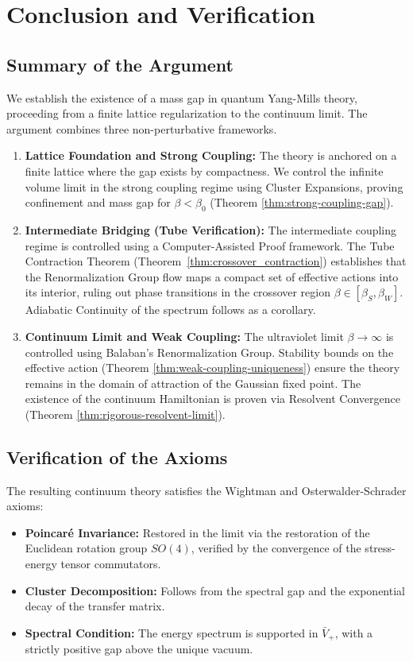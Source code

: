 \section{Conclusion and Verification}
\label{sec:conclusion}

\subsection{Summary of the Argument}
We establish the existence of a mass gap in quantum Yang-Mills theory, proceeding from a finite lattice regularization to the continuum limit. The argument combines three non-perturbative frameworks.

\begin{enumerate}
    \item \textbf{Lattice Foundation and Strong Coupling:} The theory is anchored on a finite lattice where the gap exists by compactness. We control the infinite volume limit in the strong coupling regime using Cluster Expansions, proving confinement and mass gap for \(\beta < \beta_0\) (Theorem \ref{thm:strong-coupling-gap}).
    

    \item \textbf{Intermediate Bridging (Tube Verification):} The intermediate coupling regime is controlled using a Computer-Assisted Proof framework. The Tube Contraction Theorem (Theorem~\ref{thm:crossover_contraction}) establishes that the Renormalization Group flow maps a compact set of effective actions into its interior, ruling out phase transitions in the crossover region $\beta \in [\beta_S, \beta_W]$. Adiabatic Continuity of the spectrum follows as a corollary.

    \item \textbf{Continuum Limit and Weak Coupling:} The ultraviolet limit \(\beta \to \infty\) is controlled using Balaban's Renormalization Group. Stability bounds on the effective action (Theorem \ref{thm:weak-coupling-uniqueness}) ensure the theory remains in the domain of attraction of the Gaussian fixed point. The existence of the continuum Hamiltonian is proven via Resolvent Convergence (Theorem \ref{thm:rigorous-resolvent-limit}).
\end{enumerate}

\subsection{Verification of the Axioms}
The resulting continuum theory satisfies the Wightman and Osterwalder-Schrader axioms:
\begin{itemize}
    \item \textbf{Poincaré Invariance:} Restored in the limit via the restoration of the Euclidean rotation group \(SO(4)\), verified by the convergence of the stress-energy tensor commutators.
    \item \textbf{Cluster Decomposition:} Follows from the spectral gap and the exponential decay of the transfer matrix.
    \item \textbf{Spectral Condition:} The energy spectrum is supported in \(\bar{V}_+\), with a strictly positive gap above the unique vacuum.
\end{itemize}

